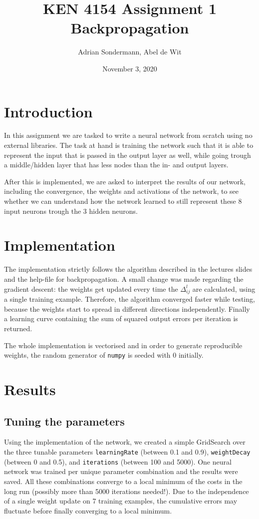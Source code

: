 \documentclass{article}
\title{\Large KEN 4154 Assignment 1 \\ \normalsize Backpropagation}
\author{Adrian Sondermann, Abel de Wit}
\date{November 3, 2020}
\begin{document}
\maketitle

\section{Introduction}
In this assignment we are tasked to write a neural network from scratch using no external libraries. The task at hand is training the network such that it is able to represent the input that is passed in the output layer as well, while going trough a middle/hidden layer that has less nodes than the in- and output layers.\newline

After this is implemented, we are asked to interpret the results of our network, including the convergence, the weights and
activations of the network, to see whether we can understand how the network learned to still represent these 8 input neurons trough the 3 hidden neurons. 

\section{Implementation}
The implementation strictly follows the algorithm described in the lectures slides and the help-file for backpropagation. A small change was made regarding the gradient descent: the weights get updated every time the $\Delta_{ij}^{l}$ are calculated, using a single training example. Therefore, the algorithm converged faster while testing, because the weights start to spread in different directions independently. Finally a learning curve containing the sum of squared output errors per iteration is returned.

The whole implementation is vectorised and in order to generate reproducible weights, the random generator of \texttt{numpy} is seeded with 0 initially. 

\section{Results}

\subsection{Tuning the parameters}
Using the implementation of the network, we created a simple GridSearch over the three tunable parameters \texttt{learningRate} (between 0.1 and 0.9),  \texttt{weightDecay} (between 0 and 0.5), and \texttt{iterations} (between 100 and 5000). 
One neural network was trained per unique parameter combination and the results were saved. All these combinations converge to a local minimum of the costs in the long run (possibly more than 5000 iterations needed!). Due to the independence of a single weight update on 7 training examples, the cumulative errors may fluctuate before finally converging to a local minimum.
\end{document}
